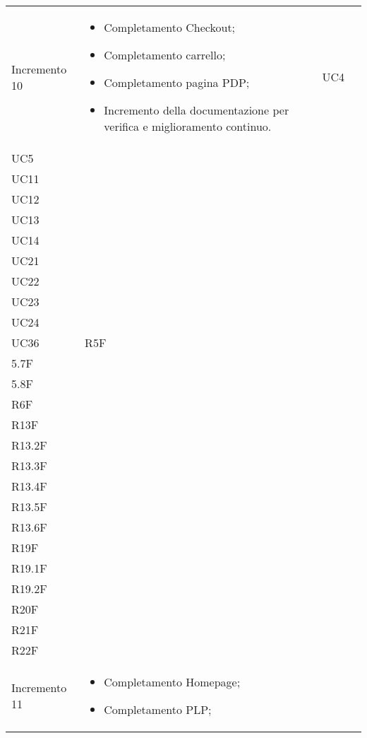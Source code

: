 \begin{longtable}{
    >{\centering}p{}
    >{\raggedright}p{}
    >{\centering}p{}
    >{\centering}p{}
    }
    Incremento 10                 & \vspace{-15px}
    \begin{itemize}
        \renewcommand\labelitemi{-}
        \item Completamento Checkout;
        \item Completamento carrello;
        \item Completamento pagina PDP;
        \item Incremento della documentazione per verifica e miglioramento continuo.
    \end{itemize}    & UC4                                                                                            \\ UC5 \\ UC11                                                                                                                                                                                     \\ UC12 \\UC13\\UC14\\ UC21 \\ UC22 \\ UC23 \\ UC24 \\ UC36 & R5F\\5.7F\\5.8F \\ R6F \\ R13F  \\ R13.2F \\R13.3F \\R13.4F \\ R13.5F \\ R13.6F \\ R19F \\ R19.1F \\ R19.2F \\ R20F \\ R21F \\ R22F
    \tabularnewline
    Incremento 11                 & \vspace{-15px}
    \begin{itemize}
        \renewcommand\labelitemi{-}
        \item Completamento Homepage;
        \item Completamento PLP;

\end{itemize}
\end{longtable}

